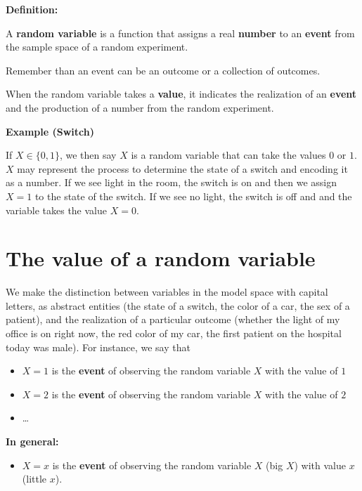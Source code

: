 \documentclass[
]{book}
\providecommand{\tightlist}{%
  \setlength{\itemsep}{0pt}\setlength{\parskip}{0pt}}
\begin{document}
\textbf{Definition:}

A \textbf{random variable} is a function that assigns a real \textbf{number} to an \textbf{event} from the sample space of a random experiment.

Remember than an event can be an outcome or a collection of outcomes.

When the random variable takes a \textbf{value}, it indicates the realization of an \textbf{event} and the production of a number from the random experiment.

\textbf{Example (Switch)}

If \(X \in \{0,1\}\), we then say \(X\) is a random variable that can take the values \(0\) or \(1\). \(X\) may represent the process to determine the state of a switch and encoding it as a number. If we see light in the room, the switch is on and then we assign \(X=1\) to the state of the switch. If we see no light, the switch is off and and the variable takes the value \(X=0\).

\hypertarget{the-value-of-a-random-variable}{%
\section{The value of a random variable}\label{the-value-of-a-random-variable}}

We make the distinction between variables in the model space with capital letters, as abstract entities (the state of a switch, the color of a car, the sex of a patient), and the realization of a particular outcome (whether the light of my office is on right now, the red color of my car, the first patient on the hospital today was male). For instance, we say that

\begin{itemize}
\item
  \(X=1\) is the \textbf{event} of observing the random variable \(X\) with the value of \(1\)
\item
  \(X=2\) is the \textbf{event} of observing the random variable \(X\) with the value of \(2\)
\item
  \ldots{}
\end{itemize}

\textbf{In general:}

\begin{itemize}
\tightlist
\item
  \(X=x\) is the \textbf{event} of observing the random variable \(X\) (big \(X\)) with value \(x\) (little \(x\)).
\end{itemize}
\end{document}
